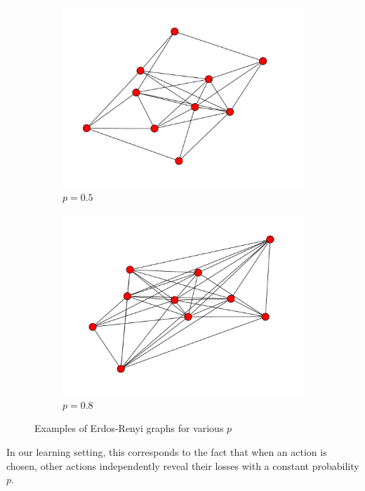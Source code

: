 \documentclass[10pt,a4paper]{scrartcl}
\begin{document}
\begin{figure}[hh!]
\begin{center}
\begin{subfigure}[b]{0.45\textwidth}
                \includegraphics[width=\textwidth]{figures/ER_graph_5.pdf}
                \caption{$p=0.5$}
        \end{subfigure}
	 \begin{subfigure}[b]{0.45\textwidth}
                \includegraphics[width=\textwidth]{figures/ER_graph_8.pdf}
                \caption{$p=0.8$}
        \end{subfigure}
\end{center}
\caption{Examples of Erdos-Renyi graphs for various $p$}
 \label{er_ex}
\end{figure}

In our learning setting, this corresponds to the fact that when an action is chosen, other actions independently reveal their losses with a constant probability $p$.
\end{document}

